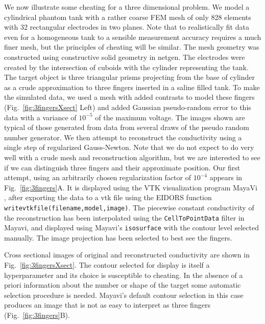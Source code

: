 \documentclass[12pt]{iopart}
\begin{document}
We now illustrate some cheating for a three dimensional
problem. We model a cylindrical phantom tank with a rather
coarse FEM mesh of only 828 elements with 32 rectangular
electrodes in two planes. Note that to realistically
fit data even for a homogeneous tank to a sensible
measurement accuracy requires a much finer mesh, but the
principles of cheating will be similar. The mesh geometry
was constructed using constructive solid geometry in
netgen. The electrodes were created by the intersection
of cuboids with the cylinder representing the tank. The
target object is three triangular prisms projecting from
the base of cylinder as a crude approximation to three
fingers inserted in a saline filled tank. To make the
simulated data, we used a mesh with added contrasts to model
these fingers (Fig.~\ref{fig:3fingersXsect} Left) and added Gaussian pseudo-random
error to this data with a variance of $10^{-5}$ of the maximum
voltage. The images shown are typical of those generated
from data from several draws of the pseudo random number
generator. We then attempt to reconstruct the conductivity
using a single step of regularized Gauss-Newton. Note that we do not expect to do
very well with a crude mesh and reconstruction algorithm,
but we are interested to see if we can distinguish three
fingers and their approximate position. Our first attempt,
using an arbitrarily chosen regularization factor
of $10^{-4}$ appears in Fig.~\ref{fig:3fingers}A. It is
displayed using the VTK visualization program MayaVi
\cite{Ramachandran_2003}, after exporting the data to a vtk file
using the EIDORS function {\tt writevtkfile(filename,model,image)}. The
piecewise constant conductivity of the reconstruction has
been interpolated using the {\tt CellToPointData} filter in
Mayavi, and displayed using Mayavi's {\tt isosurface} with
the contour level selected manually. The image projection
has been selected to best see the fingers.


Cross sectional images of original and reconstructed
conductivity are shown in Fig.~\ref{fig:3fingersXsect}.
The contour selected for display is itself a
hyperparameter and its choice is susceptible to
cheating. In the absence of a priori information about
the number or shape of the target some automatic selection
procedure is needed. Mayavi's default contour selection
in this case produces an image that is not as easy to
interpret as three fingers (Fig.~\ref{fig:3fingers}B).
\end{document}

